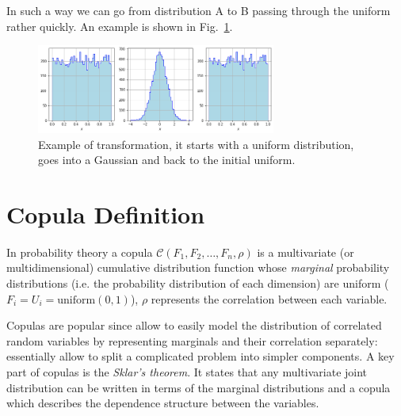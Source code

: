 In such a way we can go from distribution A to B passing through the uniform rather quickly. An example is shown in Fig.~\ref{fig:a_to_b_to_a}.

\begin{figure}[htbp]
\centering
\includegraphics[width=0.7\textwidth]{figures/a_to_b_to_a}
\caption{Example of transformation, it starts with a uniform distribution, goes into a Gaussian and back to the initial uniform.}
\label{fig:a_to_b_to_a}
\end{figure}

\section{Copula Definition}
\label{copula}




In probability theory a copula $\mathcal{C}(F_1, F_2, \ldots, F_n, \rho)$ is a multivariate (or multidimensional) cumulative distribution function whose \emph{marginal} probability distributions (i.e. the probability distribution of each dimension) are uniform ($F_i = U_i =\mathrm{uniform}(0,1)$), $\rho$ represents the correlation between each variable.

Copulas are popular since allow to easily model the distribution of correlated random variables by representing marginals and their correlation separately: essentially allow to split a complicated problem into simpler components.
A key part of copulas is the \emph{Sklar’s theorem}. It states that any multivariate joint distribution can be written in terms of the marginal distributions and a copula which describes the dependence structure between the variables. 

